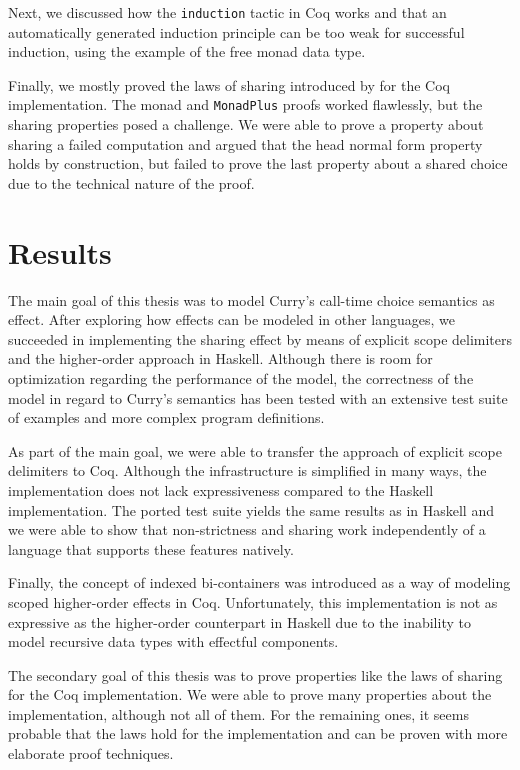 \documentclass[a4paper, 11pt, fleqn, twoside, abstract=on]{scrreprt}
\newcommand{\hinl}[1]{\texttt{#1}}
\newcommand{\cinl}[1]{\texttt{#1}}
\begin{document}
Next, we discussed how the \cinl{induction} tactic in Coq works and that an automatically generated induction principle can be too weak for successful induction, using the example of the free monad data type.

Finally, we mostly proved the laws of sharing introduced by \citet{fischer2009purely} for the Coq implementation.
The monad and \hinl{MonadPlus} proofs worked flawlessly, but the sharing properties posed a challenge.
We were able to prove a property about sharing a failed computation and argued that the head normal form property holds by construction, but failed to prove the last property about a shared choice due to the technical nature of the proof.

\section{Results}
The main goal of this thesis was to model Curry's call-time choice semantics as effect.
After exploring how effects can be modeled in other languages, we succeeded in implementing the sharing effect by means of explicit scope delimiters and the higher-order approach in Haskell.
Although there is room for optimization regarding the performance of the model, the correctness of the model in regard to Curry's semantics has been tested with an extensive test suite of examples and more complex program definitions.

As part of the main goal, we were able to transfer the approach of explicit scope delimiters to Coq.
Although the infrastructure is simplified in many ways, the implementation does not lack expressiveness compared to the Haskell implementation.
The ported test suite yields the same results as in Haskell and we were able to show that non-strictness and sharing work independently of a language that supports these features natively.

Finally, the concept of indexed bi-containers was introduced as a way of modeling scoped higher-order effects in Coq.
Unfortunately, this implementation is not as expressive as the higher-order counterpart in Haskell due to the inability to model recursive data types with effectful components.

The secondary goal of this thesis was to prove properties like the laws of sharing for the Coq implementation.
We were able to prove many properties about the implementation, although not all of them. 
For the remaining ones, it seems probable that the laws hold for the implementation and can be proven with more elaborate proof techniques.
\end{document}
